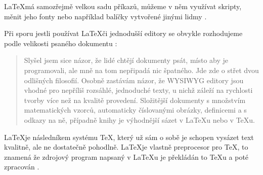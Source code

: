 \documentclass[a4paper, 11pt]{article}
\begin{document}
\LaTeX má samozřejmě velkou sadu příkazů, můžeme v něm využívat skripty, měnit jeho fonty nebo například balíčky vytvořené jinými lidmy \cite{fonty}.

 
Při sporu jestli používat \LaTeX  či jednodušší editory se obvykle rozhodujeme podle velikosti psaného dokumentu \cite{latex_vut}:

\begin{quotation}
Slyšel jsem sice názor, že lidé chtějí dokumenty psát, místo aby je programovali, ale mně na tom nepřipadá nic špatného. Jde zde o střet dvou odlišných filosofií. Osobně zastávám názor, že WYSIWYG editory jsou vhodné pro nepříliš rozsáhlé, jednoduché texty, u nichž záleží na rychlosti tvorby více než na kvalitě provedení. Složitější dokumenty s množstvím matematických vzorců, automaticky číslovanými obrázky, definicemi a s odkazy na ně, případně knihy je výhodnější sázet v LaTeXu nebo v TeXu. 
\end{quotation}


\LaTeX je následníkem systému \TeX , který už sám o sobě je schopen vysázet text kvalitně, ale ne dostatečně pohodlně. \LaTeX  je vlastně preprocesor pro \TeX , to znamená že zdrojový program napsaný v \LaTeX u je překládán to \TeX u a poté zpracován \cite{latex_manual}.



\pagebreak



\end{document}

